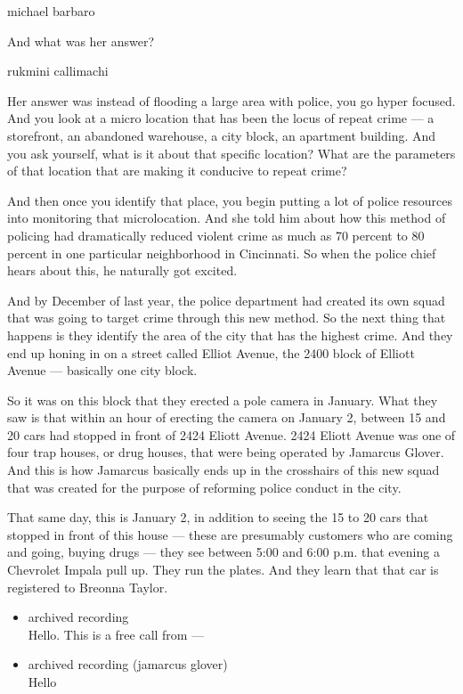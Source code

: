 michael barbaro

And what was her answer?

rukmini callimachi

Her answer was instead of flooding a large area with police, you go
hyper focused. And you look at a micro location that has been the locus
of repeat crime --- a storefront, an abandoned warehouse, a city block,
an apartment building. And you ask yourself, what is it about that
specific location? What are the parameters of that location that are
making it conducive to repeat crime?

And then once you identify that place, you begin putting a lot of police
resources into monitoring that microlocation. And she told him about how
this method of policing had dramatically reduced violent crime as much
as 70 percent to 80 percent in one particular neighborhood in
Cincinnati. So when the police chief hears about this, he naturally got
excited.

And by December of last year, the police department had created its own
squad that was going to target crime through this new method. So the
next thing that happens is they identify the area of the city that has
the highest crime. And they end up honing in on a street called Elliot
Avenue, the 2400 block of Elliott Avenue --- basically one city block.

So it was on this block that they erected a pole camera in January. What
they saw is that within an hour of erecting the camera on January 2,
between 15 and 20 cars had stopped in front of 2424 Eliott Avenue. 2424
Eliott Avenue was one of four trap houses, or drug houses, that were
being operated by Jamarcus Glover. And this is how Jamarcus basically
ends up in the crosshairs of this new squad that was created for the
purpose of reforming police conduct in the city.

That same day, this is January 2, in addition to seeing the 15 to 20
cars that stopped in front of this house --- these are presumably
customers who are coming and going, buying drugs --- they see between
5:00 and 6:00 p.m. that evening a Chevrolet Impala pull up. They run the
plates. And they learn that that car is registered to Breonna Taylor.

\begin{itemize}
\item
  archived recording\\
  Hello. This is a free call from ---
\item
  archived recording (jamarcus glover)\\
  Hello
\end{itemize}

